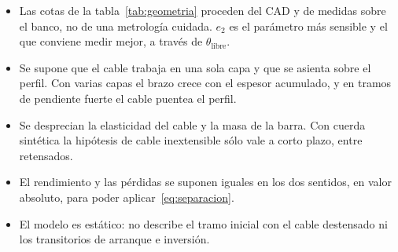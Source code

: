 \begin{itemize}
  \item Las cotas de la tabla~\ref{tab:geometria} proceden del CAD y de medidas sobre el banco, no de
        una metrología cuidada. $e_2$ es el parámetro más sensible y el que conviene medir mejor, a
        través de $\theta_{\text{libre}}$.
  \item Se supone que el cable trabaja en una sola capa y que se asienta sobre el perfil. Con varias
        capas el brazo crece con el espesor acumulado, y en tramos de pendiente fuerte el cable
        puentea el perfil.
  \item Se desprecian la elasticidad del cable y la masa de la barra. Con cuerda sintética la
        hipótesis de cable inextensible sólo vale a corto plazo, entre retensados.
  \item El rendimiento y las pérdidas se suponen iguales en los dos sentidos, en valor absoluto, para
        poder aplicar~\eqref{eq:separacion}.
  \item El modelo es estático: no describe el tramo inicial con el cable destensado ni los
        transitorios de arranque e inversión.
\end{itemize}
